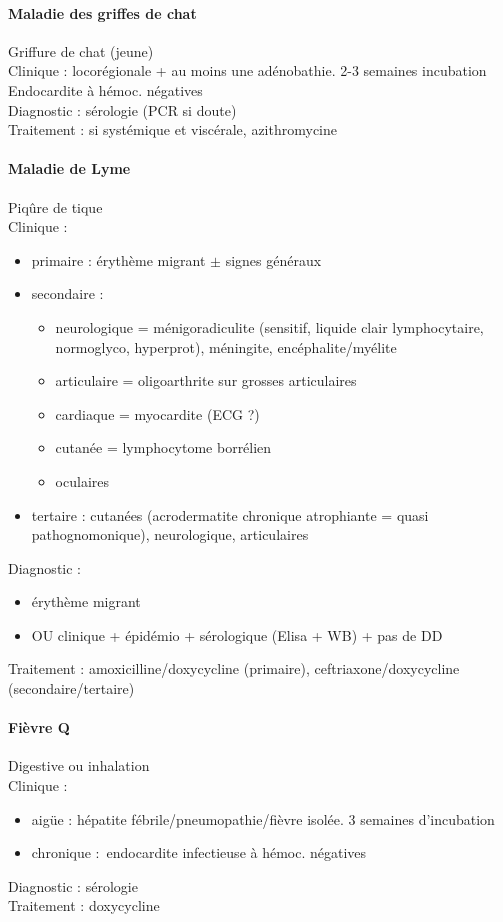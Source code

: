 \documentclass{article}
\begin{document}
\paragraph{Maladie des griffes de chat} Griffure de chat (jeune)\\
Clinique : locorégionale + au moins une adénobathie. 2-3 semaines incubation
Endocardite à hémoc. négatives\\
Diagnostic : sérologie (PCR si doute)\\
Traitement : si systémique et viscérale, azithromycine

\paragraph{Maladie de Lyme} Piqûre de tique\\
Clinique :
\begin{itemize}
  \item primaire : érythème migrant $\pm$ signes généraux
  \item secondaire : 
    \begin{itemize}
      \item neurologique = ménigoradiculite (sensitif, liquide clair
        lymphocytaire, normoglyco, hyperprot), méningite, encéphalite/myélite
      \item articulaire = oligoarthrite sur grosses articulaires
      \item cardiaque = myocardite (ECG ?)
      \item cutanée = lymphocytome borrélien
      \item oculaires 
    \end{itemize}
  \item tertaire : cutanées (acrodermatite chronique atrophiante = quasi
    pathognomonique), neurologique, articulaires
\end{itemize}
Diagnostic : 
\begin{itemize}
  \item érythème migrant
  \item OU clinique + épidémio + sérologique (Elisa + WB) + pas de DD
\end{itemize}
Traitement : amoxicilline/doxycycline (primaire), ceftriaxone/doxycycline
(secondaire/tertaire)

\paragraph{Fièvre Q} Digestive ou inhalation\\
Clinique : 
\begin{itemize}
  \item aigüe : hépatite fébrile/pneumopathie/fièvre isolée. 3 semaines d'incubation
  \item chronique : endocardite infectieuse à hémoc. négatives
\end{itemize}
Diagnostic : sérologie\\
Traitement : doxycycline
\end{document}
